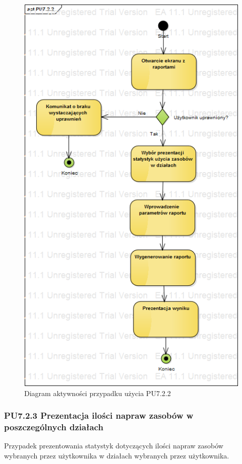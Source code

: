 \begin{figure}[h!]
	\centering
	\includegraphics[scale=0.6]{img/diagrams/activityDiagrams/PU722}
	\caption{Diagram aktywności przypadku użycia PU7.2.2 \label{fig:labelADPU7.2.2}}
\end{figure}

\subsubsection{PU7.2.3 Prezentacja ilości napraw zasobów w poszczególnych działach}
Przypadek prezentowania statystyk dotyczących ilości napraw zasobów wybranych przez użytkownika w działach wybranych przez użytkownika.

